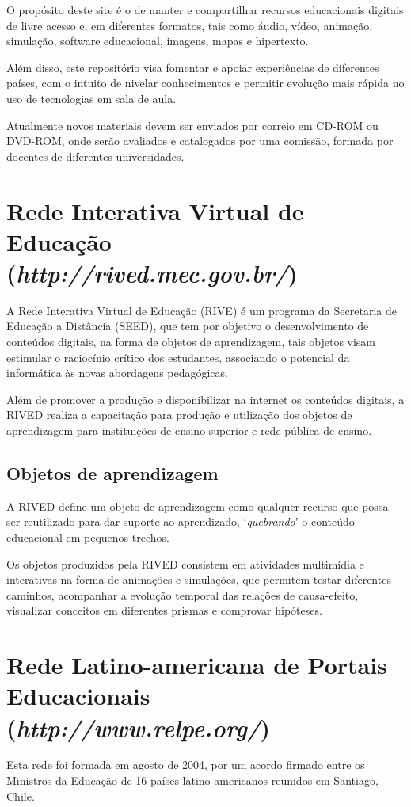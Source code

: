     O propósito deste site é o de manter e compartilhar recursos
    educacionais digitais de livre acesso e, em diferentes formatos, tais
    como áudio, vídeo, animação, simulação, software educacional, imagens,
    mapas e hipertexto.

    Além disso, este repositório visa fomentar e apoiar experiências de
    diferentes países, com o intuito de nivelar conhecimentos e permitir
    evolução mais rápida no uso de tecnologias em sala de aula.

    Atualmente novos materiais devem ser enviados por correio em CD-ROM ou
    DVD-ROM, onde serão avaliados e catalogados por uma comissão, formada
    por docentes de diferentes universidades.

    \section{Rede Interativa Virtual de Educação
            \\(\emph{http://rived.mec.gov.br/})}
    A Rede Interativa Virtual de Educação (RIVE) é um programa da Secretaria
    de Educação a Distância (SEED), que tem por objetivo o desenvolvimento
    de conteúdos digitais, na forma de objetos de aprendizagem, tais objetos
    visam estimular o raciocínio crítico dos estudantes, associando o
    potencial da informática às novas abordagens pedagógicas.

    Além de promover a produção e disponibilizar na internet os conteúdos
    digitais, a RIVED realiza a capacitação para produção e utilização dos
    objetos de aprendizagem para instituições de ensino superior e rede
    pública de ensino.

        \subsection{Objetos de aprendizagem}
        A RIVED define um objeto de aprendizagem como qualquer recurso que
        possa ser reutilizado para dar suporte ao aprendizado,
        `\emph{quebrando}' o conteúdo educacional em pequenos trechos.

        Os objetos produzidos pela RIVED consistem em atividades multimídia
        e interativas na forma de animações e simulações, que permitem
        testar diferentes caminhos, acompanhar a evolução temporal das
        relações de causa-efeito, visualizar conceitos em diferentes prismas
        e comprovar hipóteses.

    \section{Rede Latino-americana de Portais Educacionais
            \\(\emph{http://www.relpe.org/})}
    Esta rede foi formada em agosto de 2004, por um acordo firmado entre os
    Ministros da Educação de 16 países latino-americanos reunidos em
    Santiago, Chile.

